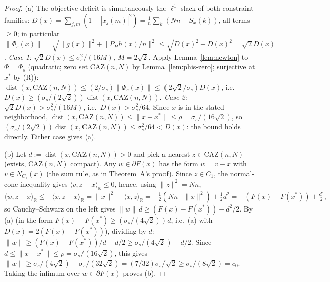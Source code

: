 \documentclass[11pt]{article}
\theoremstyle{plain}
\theoremstyle{definition}
\theoremstyle{remark}
\newcommand{\R}{\mathbb R}
\newcommand{\CAZ}{\mathrm{CAZ}}
\newcommand{\dist}{\operatorname{dist}}
\begin{document}
\begin{proof}
(a) The objective deficit is simultaneously the $\ell^1$ slack of both
constraint families:
$D(x)=\sum_{j,m}(1-|x_j(m)|^2)=\tfrac1n\sum_k(Nn-S_x(k))$, all terms
$\ge0$; in particular $\|\Phi_s(x)\|=\sqrt{\|g(x)\|^2+\|P_Hh(x)/n\|^2}\le\sqrt{D(x)^2+D(x)^2}=\sqrt2D(x)$.
\emph{Case 1: $\sqrt2D(x)\le\sigma_s^2/(16M)$, $M=2\sqrt2$.} Apply
Lemma~\ref{lem:newton} to $\Phi=\Phi_s$ (quadratic; zero set $\CAZ(n,N)$ by
Lemma~\ref{lem:phis-zero}; surjective at $x^*$ by (R)):
$\dist(x,\CAZ(n,N))\le(2/\sigma_s)\|\Phi_s(x)\|\le(2\sqrt2/\sigma_s)D(x)$,
i.e.\ $D(x)\ge(\sigma_s/(2\sqrt2))\dist(x,\CAZ(n,N))$.
\emph{Case 2: $\sqrt2D(x)>\sigma_s^2/(16M)$}, i.e.\ $D(x)>\sigma_s^2/64$.
Since $x$ is in the stated neighborhood, $\dist(x,\CAZ(n,N))\le\|x-x^*\|\le\rho=\sigma_s/(16\sqrt2)$,
so $(\sigma_s/(2\sqrt2))\dist(x,\CAZ(n,N))\le\sigma_s^2/64<D(x)$: the bound
holds directly. Either case gives (a).

(b) Let $d:=\dist(x,\CAZ(n,N))>0$ and pick a nearest $z\in\CAZ(n,N)$
(exists, $\CAZ(n,N)$ compact). Any $w\in\partial F(x)$ has the form
$w=v-x$ with $v\in N_{C_1}(x)$ (the sum rule, as in Theorem~A's proof).
Since $z\in C_1$, the normal-cone inequality gives $\langle v,z-x\rangle_\R\le0$,
hence, using $\|z\|^2=Nn$,
$$\langle w,z-x\rangle_\R\le-\langle x,z-x\rangle_\R=\|x\|^2-\langle x,z\rangle_\R
=-\tfrac12(Nn-\|x\|^2)+\tfrac12d^2=-(F(x)-F(x^*))+\tfrac{d^2}2,$$
so Cauchy--Schwarz on the left gives $\|w\|\,d\ge(F(x)-F(x^*))-d^2/2$.
By (a) (in the form $F(x)-F(x^*)\ge(\sigma_s/(4\sqrt2))d$, i.e.\ (a) with
$D(x)=2(F(x)-F(x^*))$), dividing by $d$:
$\|w\|\ge(F(x)-F(x^*))/d-d/2\ge\sigma_s/(4\sqrt2)-d/2$. Since
$d\le\|x-x^*\|\le\rho=\sigma_s/(16\sqrt2)$, this gives
$\|w\|\ge\sigma_s/(4\sqrt2)-\sigma_s/(32\sqrt2)=(7/32)\sigma_s/\sqrt2\ge\sigma_s/(8\sqrt2)=c_0$.
Taking the infimum over $w\in\partial F(x)$ proves (b).


\end{proof}
\end{document}
